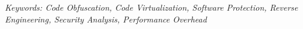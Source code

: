 \noindent %
\fontsize{10}{12}\selectfont\textit{Keywords: Code Obfuscation, Code Virtualization, Software Protection, Reverse Engineering, Security Analysis, Performance Overhead} %

